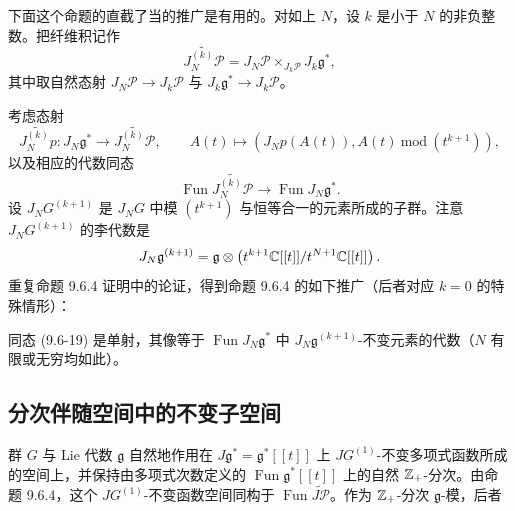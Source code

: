 
下面这个命题的直截了当的推广是有用的。对如上 $N$，设 $k$ 是小于 $N$ 的非负整数。把纤维积记作
\[
    \widetilde{J_N^{(k)}\mathcal{P}}=J_N\mathcal{P}\times_{J_k\mathcal{P}}J_k\mathfrak{g}^*,
\]
其中取自然态射 $J_N\mathcal{P}\to J_k\mathcal{P}$ 与 $J_k\mathfrak{g}^*\to J_k\mathcal{P}$。

考虑态射
\[
    \widetilde{J_N^{(k)}p}:J_N\mathfrak{g}^*\to\widetilde{J_N^{(k)}\mathcal{P}},
    \qquad
    A(t)\mapsto\left(J_Np(A(t)),A(t)\ \mathrm{mod}\ (t^{k+1})\right),
\]
以及相应的代数同态
\begin{equation}
    \operatorname{Fun}\widetilde{J_N^{(k)}\mathcal{P}}\to\operatorname{Fun}J_N\mathfrak{g}^* .
    \tag{9.6-19}
\end{equation}
设 $J_NG^{(k+1)}$ 是 $J_NG$ 中模 $(t^{k+1})$ 与恒等合一的元素所成的子群。注意 $J_NG^{(k+1)}$ 的李代数是
\[
    J_N\mathfrak{g}^{(k+1)}=\mathfrak{g}\otimes\left(t^{k+1}\mathbb{C}[[t]]/t^{N+1}\mathbb{C}[[t]]\right).
\]
重复命题 9.6.4 证明中的论证，得到命题 9.6.4 的如下推广（后者对应 $k=0$ 的特殊情形）：

\begin{proposition}
    同态 (9.6-19) 是单射，其像等于 $\operatorname{Fun}J_N\mathfrak{g}^*$ 中 $J_N\mathfrak{g}^{(k+1)}$-不变元素的代数（$N$ 有限或无穷均如此）。
\end{proposition}


\subsection{分次伴随空间中的不变子空间}

群 $G$ 与 Lie 代数 $\mathfrak{g}$ 自然地作用在 $J\mathfrak{g}^*=\mathfrak{g}^*[[t]]$ 上 $JG^{(1)}$-不变多项式函数所成的空间上，并保持由多项式次数定义的 $\operatorname{Fun}\mathfrak{g}^*[[t]]$ 上的自然 $\mathbb{Z}_+$-分次。由命题 9.6.4，这个 $JG^{(1)}$-不变函数空间同构于 $\operatorname{Fun}\widetilde{J\mathcal{P}}$。作为 $\mathbb{Z}_+$-分次 $\mathfrak{g}$-模，后者

